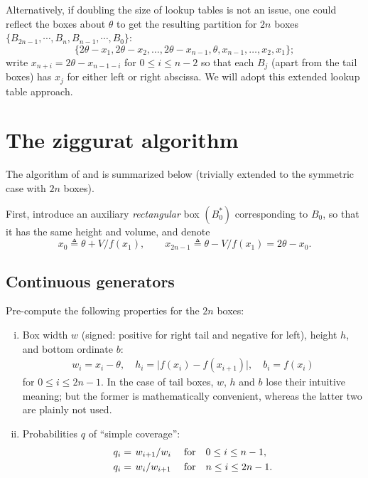 \documentclass{article}
\newcommand{\slfrac}[2]{\left. #1 \middle/ #2 \right.}
\theoremstyle{definition} %
\newcommand{\ignore}[1]{}
\newcommand{\Mode}{\theta}
\begin{document}
    Alternatively, if doubling the size of lookup tables is not an issue, one could reflect the boxes about $\Mode $ to get the resulting partition for $2 n$ boxes $\{ B_{2n - 1}, \cdots , B_n, B_{n - 1}, \cdots , B_0 \}$:
    \[
        \{ 2 \Mode - x_1, 2 \Mode - x_2, \dots, 2 \Mode - x_{n - 1}, \Mode , x_{n - 1}, \dots, x_2, x_1 \};
    \]
    write $x_{n + i} = 2 \Mode - x_{n - 1 - i}$ for $0 \le i \le n - 2$ so that each $B_j$ (apart from the tail boxes) has $x_j$ for either left or right abscissa. We will adopt this extended lookup table approach.

\section{The ziggurat algorithm}

    The algorithm of \citet{Marsaglia+Tsang} and \citet{Doornik:05} is summarized below (trivially extended to the symmetric case with $2 n$ boxes).\ignore{We propose using extended lookup tables, which would allow to avoid scaling of random numbers and calculating absolute values, thus improving both accuracy and performance.}

    First, introduce an auxiliary \emph{rectangular} box $\left( B_0^* \right)$ corresponding to $B_0$, so that it has the same height and volume, and denote
    \[
        x_0 \triangleq \Mode + V / f(x_1), \qquad x_{2 n - 1} \triangleq \Mode - V / f(x_1) = 2 \Mode - x_0.
    \]

\subsection{Continuous generators}
    Pre-compute the following properties for the $2 n$ boxes:
    \begin{enumerate}[(i)]
        \item Box width $w$ (signed: positive for right tail and negative for left), height $h$, and bottom ordinate $b$:
            \begin{align*}
                w_i = x_i - \Mode , \quad h_i = \big| f(x_i) - f(x_{i + 1}) \big|, \quad b_i = f(x_i)
            \end{align*}
            for $0 \le i \le 2 n - 1$. In the case of tail boxes, $w$, $h$ and $b$ lose their intuitive meaning; but the former is mathematically convenient, whereas the latter two are plainly not used.

        \item Probabilities $q$ of ``simple coverage'':
            \begin{align*}
                q_i &= \slfrac{w_{i + 1}}{w_{i}} \quad \text{for} \quad 0 \le i \le n - 1, \\
                q_i &= \slfrac{w_{i}}{w_{i + 1}} \quad \text{for} \quad n \le i \le 2 n - 1.
            \end{align*}
    \end{enumerate}
\end{document}

